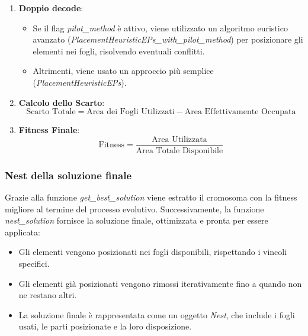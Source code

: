 \begin{enumerate}
    \item \textbf{Doppio decode}:
    \begin{itemize}
        \item Se il flag \emph{pilot\_method} è attivo, viene utilizzato un algoritmo euristico avanzato (\emph{PlacementHeuristicEPs\_with\_pilot\_method}) per posizionare gli elementi nei fogli, risolvendo eventuali conflitti.
        \item Altrimenti, viene usato un approccio più semplice (\emph{PlacementHeuristicEPs}).
    \end{itemize}
    \item \textbf{Calcolo dello Scarto}:
    \[
    \text{Scarto Totale} = \text{Area dei Fogli Utilizzati} - \text{Area Effettivamente Occupata}
    \]
    \item \textbf{Fitness Finale}:
    \[
    \text{Fitness} = \frac{\text{Area Utilizzata}}{\text{Area Totale Disponibile}}
    \]
\end{enumerate}

\subsubsection*{Nest della soluzione finale}

Grazie alla funzione \emph{get\_best\_solution} viene estratto il cromosoma con la fitness migliore al termine del processo evolutivo. Successivamente, la funzione \emph{nest\_solution} fornisce la soluzione finale, ottimizzata e pronta per essere applicata:

\begin{itemize}
    \item Gli elementi vengono posizionati nei fogli disponibili, rispettando i vincoli specifici.
    \item Gli elementi già posizionati vengono rimossi iterativamente fino a quando non ne restano altri.
    \item La soluzione finale è rappresentata come un oggetto \emph{Nest}, che include i fogli usati, le parti posizionate e la loro disposizione.
\end{itemize}










